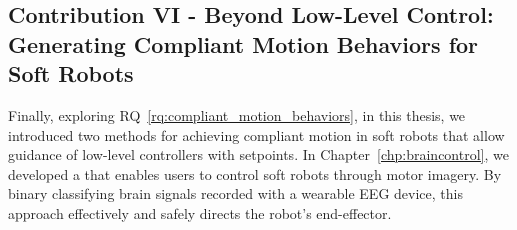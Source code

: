 \subsection{Contribution VI - Beyond Low-Level Control: Generating Compliant Motion Behaviors for Soft Robots}
Finally, exploring \gls{RQ}~\ref{rq:compliant_motion_behaviors}, in this thesis, we introduced two methods for achieving compliant motion in soft robots that allow guidance of low-level controllers with setpoints. In Chapter~\ref{chp:braincontrol}, we developed a  that enables users to control soft robots through motor imagery. By binary classifying brain signals recorded with a wearable \gls{EEG} device, this approach effectively and safely directs the robot’s end-effector.

